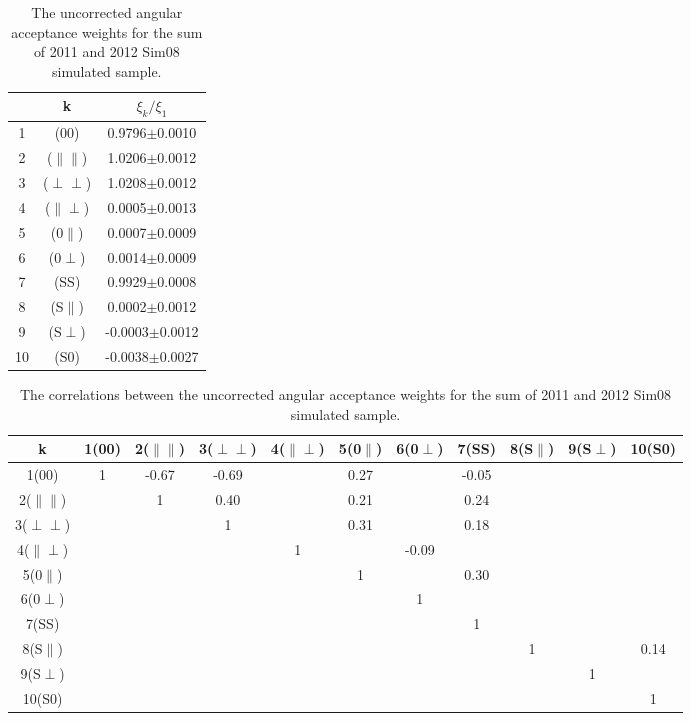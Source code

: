  \begin{table}[htb]
  \caption{
    The uncorrected angular acceptance weights for the sum of 2011 and 2012 Sim08 simulated sample.}
    \small{
\begin{center}\begin{tabular}{ccc}
    \hline
   & k & $\xi_{k}/\xi_{1}$   \\
    \hline
  1 & (00) & 0.9796$\pm$0.0010 \\
  2 & ($\parallel\parallel$) & 1.0206$\pm$0.0012\\
  3 & ($\perp\perp$) & 1.0208$\pm$0.0012\\
  4 & ($\parallel\perp$) & 0.0005$\pm$0.0013\\
  5 & (0$\parallel$) & 0.0007$\pm$0.0009\\
  6 & (0$\perp$) & 0.0014$\pm$0.0009\\
  7 & (SS) & 0.9929$\pm$0.0008\\
  8 & (S$\parallel$) & 0.0002$\pm$0.0012\\
  9 & (S$\perp$) & -0.0003$\pm$0.0012\\
  10 & (S0) & -0.0038$\pm$0.0027\\
  \hline
    \end{tabular}\end{center}
  }
\label{tab:UnccorrAngAccMCfull}
\end{table}

 \begin{table}[htb]
  \caption{
    The correlations between the uncorrected angular acceptance weights for the sum of 2011 and 2012 Sim08 simulated sample.
}
    \small{
\begin{center}\begin{tabular}{ccccccccccc}
    \hline
   k & 1(00) & 2($\parallel\parallel$)&3($\perp\perp$)&4($\parallel\perp$)&5(0$\parallel$)&6(0$\perp$)&7(SS)&8(S$\parallel$)&9(S$\perp$)&10(S0)   \\
    \hline
  1(00) & 1  & -0.67 & -0.69 & & 0.27 & & -0.05 & & &\\
  2($\parallel\parallel$) & & 1 & 0.40 & & 0.21 & & 0.24 & & &\\
  3($\perp\perp$) & & & 1 & & 0.31 & & 0.18 & & &\\
  4($\parallel\perp$) & & & & 1 & & -0.09 & & & & \\
  5(0$\parallel$) & & & & & 1 & & 0.30 & & &\\
  6(0$\perp$) & & & & & & 1 & & & & \\
  7(SS) & & & & & & & 1 & & &\\
  8(S$\parallel$) & & & & & & & & 1 & & 0.14\\
  9(S$\perp$) & & & & & & & & & 1 & \\
  10(S0) & & & & & & & & & & 1\\
  \hline
    \end{tabular}\end{center}
  }
\label{tab:UnccorrAngAccMCfullCorrMatrix}
\end{table}

